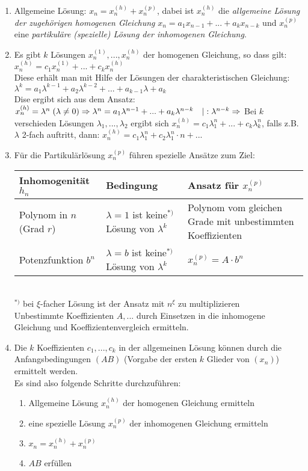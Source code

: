 \begin{enumerate}
\item Allgemeine Lösung: $\boxed{x_n=x_n^{(h)}+x_n^{(p)}}$, dabei ist $x_n^{(h)}$ die \emph{allgemeine Lösung der zugehörigen homogenen Gleichung} $\boxed{x_n=a_1 x_{n-1}+...+a_k x_{n-k}}$ und $x_n^{(p)}$ eine \emph{partikuläre (spezielle) Lösung der inhomogenen Gleichung}.
\item Es gibt $k$ Lösungen $x_n^{(1)},...,x_n^{(h)}$ der homogenen Gleichung, so dass gilt:\\
$x_n^{(h)}=c_1 x_n^{(1)}+...+c_k x_n^{(h)}$\\
Diese erhält man mit Hilfe der Lösungen der charakteristischen Gleichung:\\
$\lambda^k=a_1 \lambda^{k-1}+a_2 \lambda^{k-2}+...+a_{k-1} \lambda+a_k$\\
Dise ergibt sich aus dem Ansatz:\\
$x_n^{(h)}= \lambda^n \; (\lambda \not = 0)\\
\Rightarrow \lambda^n = a_1 \lambda^{n-1}+...+a_k \lambda^{n-k} \quad |: \lambda^{n-k}\\
\Rightarrow $ Bei $k$ verschieden Lösungen $\lambda_1, ..., \lambda_2$ ergibt sich $x_n^{(h)}=c_1 \lambda_1^n+...+c_k \lambda_k^n$, falls z.B. $\lambda$ 2-fach auftritt, dann: $x_n^{(h)}=c_1\lambda_1^n+c_2\lambda_1^n\cdot n +...$
\item Für die Partikulärlösung $x_n^{(p)}$ führen spezielle Ansätze zum Ziel:\\
\begin{tabular}{ 
p{} | >{\raggedright}
p{} | >{\raggedright}
p{}}
Inhomogenität $h_n$ & Bedingung & Ansatz für $x_n^{(p)}$\tabularnewline
\hline
Polynom in $n$ (Grad $r$) & $\lambda = 1$ ist keine$^{*)}$ Lösung von $\lambda^k$ & Polynom vom gleichen Grade mit unbestimmten Koeffizienten\tabularnewline
\hline
Potenzfunktion $b^n$ & $\lambda = b$ ist keine$^{*)}$ Lösung von $\lambda^k$ & $x_n^{(p)}=A \cdot b^n$
\end{tabular}\\
$^{*)}$ bei $\xi$-facher Lösung ist der Ansatz mit $n^\xi$ zu multiplizieren\\
Unbestimmte Koeffizienten $A, ...$ durch Einsetzen in die inhomogene Gleichung und Koeffizientenvergleich ermitteln.
\item Die $k$ Koeffizienten $c_1,...,c_k$ in der allgemeinen Lösung können durch die Anfangsbedingungen $(AB)$ (Vorgabe der ersten $k$ Glieder von $(x_n)$) ermittelt werden.\\
Es sind also folgende Schritte durchzuführen:
\begin{enumerate}[label=\Alph*)]
\item Allgemeine Lösung $x_n^{(h)}$ der homogenen Gleichung ermitteln
\item eine spezielle Lösung $x_n^{(p)}$ der inhomogenen Gleichung ermitteln
\item $x_n = x_n^{(h)}+x_n^{(p)}$
\item $AB$ erfüllen
\end{enumerate}
\end{enumerate}
